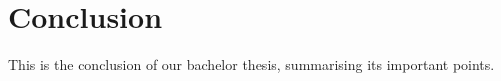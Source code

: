 \chapter*{Conclusion}
This is the conclusion of our bachelor thesis, summarising its important points.